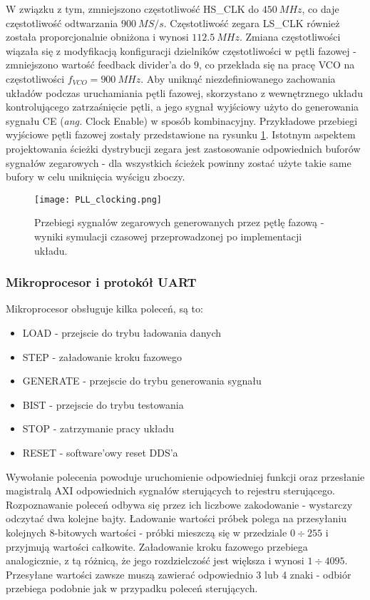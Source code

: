             W związku z tym, zmniejszono częstotliwość HS\_CLK do $450 \ MHz$, co daje częstotliwość 
            odtwarzania $900 \ MS/s$. Częstotliwość zegara LS\_CLK również została proporcjonalnie obniżona i wynosi $112.5 \ MHz$. 
            Zmiana częstotliwości wiązała się z modyfikacją konfiguracji dzielników częstotliwości w pętli fazowej - zmniejszono 
            wartość feedback divider'a do $9$, co przekłada się na pracę VCO na częstotliwości $f_{VCO} = 900\ MHz$. Aby uniknąć 
            niezdefiniowanego zachowania układów podczas uruchamiania pętli fazowej, skorzystano z wewnętrznego układu kontrolującego 
            zatrzaśnięcie pętli, a jego sygnał wyjściowy użyto do generowania sygnału CE (\textit{ang.} Clock Enable) w sposób kombinacyjny. 
            Przykładowe przebiegi wyjściowe pętli fazowej zostały przedstawione na rysunku \ref{fig:PLL_clocking}. Istotnym 
            aspektem projektowania ścieżki dystrybucji zegara jest zastosowanie odpowiednich buforów sygnałów zegarowych - dla 
            wszystkich ścieżek powinny zostać użyte takie same bufory w celu uniknięcia wyścigu zboczy. 
            \begin{figure}[!ht]
                \centering
                \texttt{[image: PLL\_clocking.png]}
                \caption{Przebiegi sygnałów zegarowych generowanych przez pętlę fazową - wyniki symulacji czasowej przeprowadzonej po implementacji układu.}
                \label{fig:PLL_clocking}
            \end{figure}

        \subsubsection{Mikroprocesor i protokół UART}
            Mikroprocesor obsługuje kilka poleceń, są to:
            \begin{itemize}
                \item LOAD - przejscie do trybu ładowania danych
                \item STEP - załadowanie kroku fazowego
                \item GENERATE - przejscie do trybu generowania sygnału
                \item BIST - przejscie do trybu testowania
                \item STOP - zatrzymanie pracy układu
                \item RESET - software'owy reset DDS'a
            \end{itemize}
            Wywołanie polecenia powoduje uruchomienie odpowiedniej funkcji oraz przesłanie magistralą AXI odpowiednich 
            sygnałów sterujących to rejestru sterującego. Rozpoznawanie poleceń odbywa się przez ich liczbowe zakodowanie - 
            wystarczy odczytać dwa kolejne bajty. Ładowanie wartości próbek polega na przesyłaniu kolejnych 8-bitowych wartości - próbki 
            mieszczą się w przedziale $0 \div 255$ i przyjmują wartości całkowite. Załadowanie kroku fazowego przebiega analogicznie, 
            z tą różnicą, że jego rozdzielczość jest większa i wynosi $1 \div 4095$. Przesyłane wartości zawsze muszą zawierać 
            odpowiednio 3 lub 4 znaki - odbiór przebiega podobnie jak w przypadku poleceń sterujących. 
